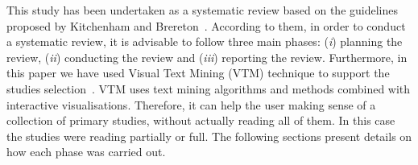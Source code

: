 This study has been undertaken as a systematic review based on the guidelines proposed by Kitchenham and Brereton~\cite{Kitchenham}. According to them, in order to conduct a systematic review, it is advisable to follow three main phases: (\textit{i}) planning the review, (\textit{ii}) conducting the review and (\textit{iii}) reporting the review. Furthermore, in this paper we have used Visual Text Mining (VTM) technique to support the studies selection~\cite{Malheiros:2007}. VTM uses text mining algorithms and methods combined with interactive visualisations. Therefore, it can help the user making sense of a collection of primary studies, without actually reading all of them. In this case the studies were reading partially or full. The following sections present details on how each phase was carried out.

